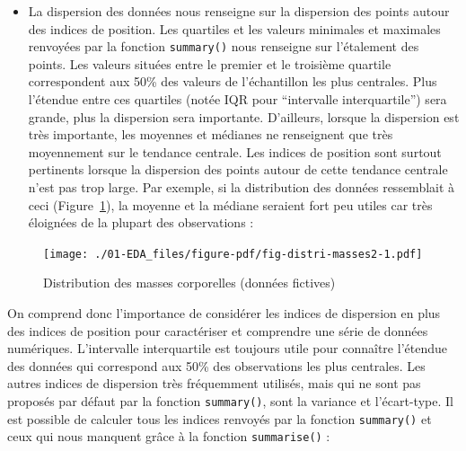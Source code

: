 \documentclass[
  a4paper,
  DIV=11,
  numbers=noendperiod,
  oneside]{scrreprt}
\providecommand{\tightlist}{%
  \setlength{\itemsep}{0pt}\setlength{\parskip}{0pt}}\usepackage{longtable,booktabs,array}
\begin{document}
\begin{itemize}
\tightlist
\item
  La dispersion des données nous renseigne sur la dispersion des points
  autour des indices de position. Les quartiles et les valeurs minimales
  et maximales renvoyées par la fonction \texttt{summary()} nous
  renseigne sur l'étalement des points. Les valeurs situées entre le
  premier et le troisième quartile correspondent aux 50\% des valeurs de
  l'échantillon les plus centrales. Plus l'étendue entre ces quartiles
  (notée IQR pour ``intervalle interquartile'') sera grande, plus la
  dispersion sera importante. D'ailleurs, lorsque la dispersion est très
  importante, les moyennes et médianes ne renseignent que très
  moyennement sur le tendance centrale. Les indices de position sont
  surtout pertinents lorsque la dispersion des points autour de cette
  tendance centrale n'est pas trop large. Par exemple, si la
  distribution des données ressemblait à ceci
  (Figure~\ref{fig-distri-masses2}), la moyenne et la médiane seraient
  fort peu utiles car très éloignées de la plupart des observations :
\end{itemize}

\begin{figure}

{\centering \texttt{[image: ./01-EDA\_files/figure-pdf/fig-distri-masses2-1.pdf]}

}

\caption{\label{fig-distri-masses2}Distribution des masses corporelles
(données fictives)}

\end{figure}

On comprend donc l'importance de considérer les indices de dispersion en
plus des indices de position pour caractériser et comprendre une série
de données numériques. L'intervalle interquartile est toujours utile
pour connaître l'étendue des données qui correspond aux 50\% des
observations les plus centrales. Les autres indices de dispersion très
fréquemment utilisés, mais qui ne sont pas proposés par défaut par la
fonction \texttt{summary()}, sont la variance et l'écart-type. Il est
possible de calculer tous les indices renvoyés par la fonction
\texttt{summary()} et ceux qui nous manquent grâce à la fonction
\texttt{summarise()} :
\end{document}
